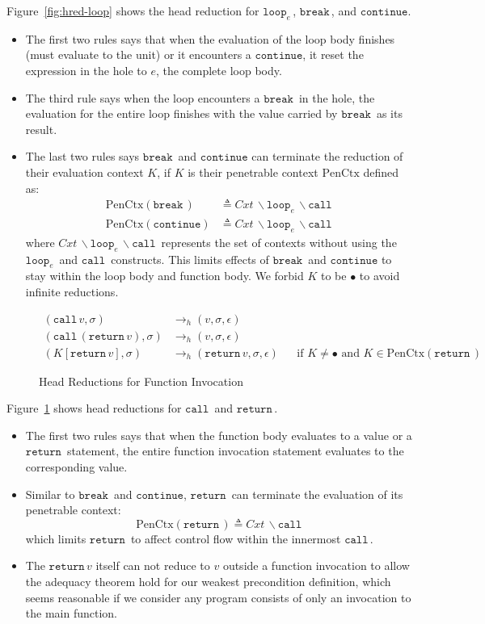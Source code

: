 \documentclass{article}
\numberwithin{algorithm}{section}
\newcommand{\cloop}[1]{\texttt{loop}_{#1}\,}
\newcommand{\cbreak}{\texttt{break}\,}
\newcommand{\ccontinue}{\texttt{continue}}
\newcommand{\creturn}{\texttt{return}\,}
\newcommand{\ccall}{\texttt{call}\,}
\newcommand{\pure}[1]{\text{PenCtx}(#1)}
\newcommand{\hred}{\rightarrow_h}
\begin{document}
Figure~\ref{fig:hred-loop} shows the head reduction for $\cloop{e}\!$, $\cbreak\!$, and $\ccontinue$.
\begin{itemize}
\item The first two rules says that when the evaluation of the loop body finishes (must evaluate to the unit) or it encounters a $\ccontinue$, it reset the expression in the hole to $e$, the complete loop body.
\item The third rule says when the loop encounters a $\cbreak\!$ in the hole, the evaluation for the entire loop finishes with the value carried by $\cbreak\!$ as its result.
\item The last two rules says $\cbreak\!$ and $\ccontinue$ can terminate the reduction of their evaluation context $K$, if $K$ is their penetrable context $\text{PenCtx}$ defined as:
$$
\begin{aligned}
    \pure{\cbreak\!} &\triangleq \textit{Cxt}\,\backslash\cloop{e}\!\backslash\ccall \\
    \pure{\ccontinue} &\triangleq \textit{Cxt}\,\backslash\cloop{e}\!\backslash\ccall
\end{aligned}
$$
where $\textit{Cxt}\,\backslash\cloop{e}\!\backslash\ccall\!$ represents the set of contexts without using the $\cloop{e}\!$ and $\ccall\!$ constructs.
This limits effects of $\cbreak\!$ and $\ccontinue$ to stay within the loop body and function body.
We forbid $K$ to be $\bullet$ to avoid infinite reductions.
\end{itemize}

\begin{figure}[h]
$$
\begin{aligned}
    (\ccall v, \sigma) &\hred (v, \sigma, \epsilon) \\
    (\ccall (\creturn v), \sigma) &\hred (v, \sigma, \epsilon) \\
    (K[\creturn v], \sigma) &\hred (\creturn v, \sigma, \epsilon) && \text{if } K \neq \bullet \text{ and } K \in \pure{\creturn\!}
\end{aligned}
$$
\caption{Head Reductions for Function Invocation}
\label{fig:hred-func}
\end{figure}

Figure~\ref{fig:hred-func} shows head reductions for $\ccall\!$ and $\creturn\!$.
\begin{itemize}
\item The first two rules says that when the function body evaluates to a value or a $\creturn\!$ statement, the entire function invocation statement evaluates to the corresponding value.
\item Similar to $\cbreak\!$ and $\ccontinue$, $\creturn\!$ can terminate the evaluation of its penetrable context:
$$
\pure{\creturn\!} \triangleq \textit{Cxt}\,\backslash\ccall
$$
which limits $\creturn\!$ to affect control flow within the innermost $\ccall\!$.
\item The $\creturn v$ itself can not reduce to $v$ outside a function invocation to allow the adequacy theorem hold for our weakest precondition definition, which seems reasonable if we consider any program consists of only an invocation to the main function.
\end{itemize}
\end{document}
